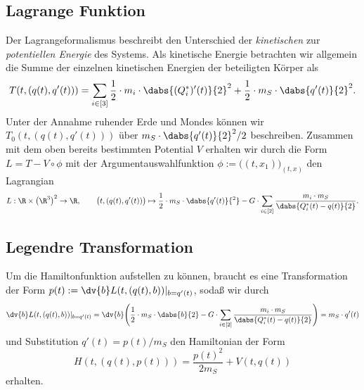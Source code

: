 \documentclass{subfiles}
\begin{document}
    \subsection*{Lagrange Funktion}
        Der Lagrangeformalismus beschreibt den Unterschied der \emph{kinetischen} zur \emph{potentiellen Energie} des Systems. Als kinetische Energie betrachten wir allgemein die Summe der einzelnen kinetischen Energien der beteiligten Körper als
        \[
            T(t,(q(t),q'(t))) = \sum_{i\in[3]}\frac12\cdot m_i\cdot\dabs{(Q_i^*)'(t)}{2}^2 + \frac12\cdot m_S\cdot\dabs{q'(t)}{2}^2.
        \]
        Unter der Annahme ruhender Erde und Mondes können wir $T_0(t,(q(t),q'(t)))$ über $m_S\cdot \dabs{q'(t)}{2}^2 / 2$ beschreiben. Zusammen mit dem oben bereits bestimmten Potential $V$ erhalten wir durch die Form $L = T - V\circ\phi$ mit der Argumentauswahlfunktion $\phi:=\bigl((t,x_1)\bigr)_{(t,x)}$ den Lagrangian
        \[
            L:\R\times\bigl(\R^3\bigr)^2\to\R,\qquad \bigl(t,(q(t),q'(t))\bigr)\mapsto \frac12\cdot m_S\cdot\dabs{q'(t)}{^2} - G\cdot\sum_{i\in[2]}\frac{m_i\cdot m_S}{\dabs{Q_i^*(t) - q(t)}{2}}.
        \]
        

    \subsection*{Legendre Transformation}
        Um die Hamiltonfunktion aufstellen zu können, braucht es eine Transformation der Form $p(t):=\dv{b}L(t,(q(t),b))|_{b=q'(t)}$, sodaß wir durch 
        \[
            \dv{b}L(t,(q(t),b))|_{b=q'(t)} = \dv{b}\Biggl(
                \frac12\cdot m_S\cdot\dabs{b}{2} - G\cdot\sum_{i\in[2]}\frac{m_i\cdot m_S}{\dabs{Q_i^*(t) - q(t)}{2}}    
            \Biggr)
            = m_S\cdot q'(t)
        \]
        und Substitution $q'(t) = p(t) / m_S$ den Hamiltonian der Form 
        \[
            H(t,(q(t),p(t))) = \frac{p(t)^2}{2m_S} + V(t,q(t))
        \]
        erhalten. 
\end{document}
